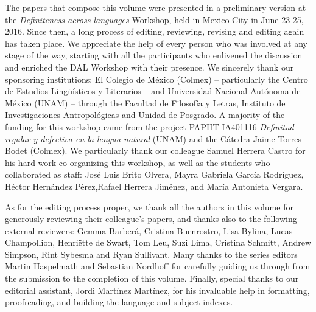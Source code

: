 \documentclass[output=paper]{langsci/langscibook}
\begin{document}
The papers that compose this volume were presented in a preliminary version at the \textit{Definiteness across languages} Workshop, held in Mexico City in June 23-25, 2016. Since then, a long process of editing, reviewing, revising and editing again has taken place. We appreciate the help of every person who was involved at any stage of the way, starting with all the participants who enlivened the discussion and enriched the DAL Workshop with their presence. We sincerely thank our sponsoring institutions: El Colegio de México (Colmex) -- particularly the Centro de Estudios Lingüísticos y Literarios -- and Universidad Nacional Autónoma de México (UNAM) -- through the Facultad de Filosofía y Letras, Instituto de Investigaciones Antropológicas and Unidad de Posgrado. A majority of the funding for this workshop came from the project PAPIIT IA401116 \textit{Definitud regular y defectiva en la lengua natural} (UNAM) and the Cátedra Jaime Torres Bodet (Colmex). We particularly thank our colleague Samuel Herrera Castro for his hard work co-organizing this workshop, as well as the students who collaborated as staff: José Luis Brito Olvera, Mayra Gabriela García Rodríguez, Héctor Hernández Pérez,\largerpage Rafael Herrera Jiménez, and María Antonieta Vergara. 

As for the editing process proper, we thank all the authors in this volume for generously reviewing their colleague’s papers, and thanks also to the following external reviewers: Gemma Barberá, Cristina Buenrostro, Lisa Bylina, Lucas Champollion, Henri\"ette de Swart, Tom Leu, Suzi Lima, Cristina Schmitt, Andrew Simpson, Rint Sybesma and Ryan Sullivant. Many thanks to the series editors Martin Haspelmath and Sebastian Nordhoff for carefully guiding us through from the submission to the completion of this volume. Finally, special thanks to our editorial assistant, Jordi Martínez Martínez, for his invaluable help in formatting, proofreading, and building the language and subject indexes.

{\sloppy
\printbibliography[heading=subbibliography,notkeyword=this]
}
\end{document}
